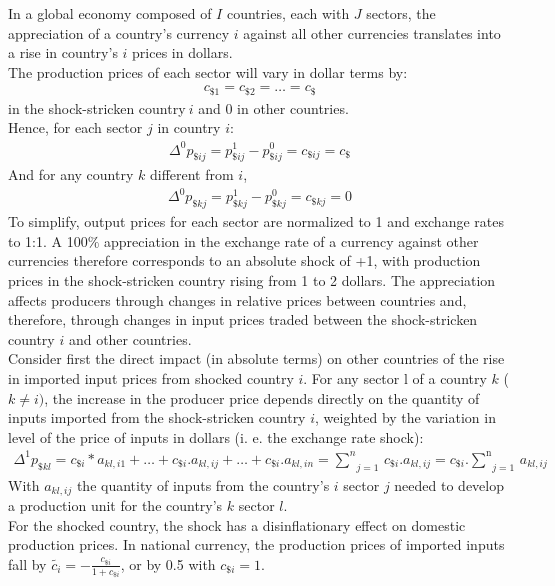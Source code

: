 \documentclass[11pt,a4paper]{article}
\begin{document}
In a global economy composed of $I$ countries, each with $J$ sectors, the appreciation of a country's currency $i$ against all other currencies translates into a rise in country's $i$ prices in dollars. \\ 
The production prices of each sector will vary in dollar terms by:
\begin{eqnarray*}
c_{\$1}=c_{\$2}=\ldots=c_{\$} 
  \end{eqnarray*}	
in the shock-stricken country$~i$ and 0 in other countries. \\
Hence, for each sector $j$ in country  $i$:
\begin{eqnarray*}
 {{\Delta }^{0}}p_{\${ij}}=p_{\${ij}}^{1}-p_{\${ij}}^{0}=c_{\${ij}}=c_{\$}
  \end{eqnarray*}	
And for any country $k$ different from $i$,
\begin{eqnarray*}
 {{\Delta }^{0}}p_{\${kj}}=p_{\${kj}}^{1}-p_{\${kj}}^{0}=c_{\${kj}}=0
 \end{eqnarray*}	
To simplify, output prices for each sector are normalized to 1 and exchange rates to 1:1. A 100$\%$ appreciation in the exchange rate of a currency against other currencies therefore corresponds to an absolute shock of +1, with production prices in the shock-stricken country rising from 1 to 2 dollars. The appreciation affects producers through changes in relative prices between countries and, therefore, through changes in input prices traded between the shock-stricken country $i$ and other countries. \\
Consider first the direct impact (in absolute terms) on other countries of the rise in imported input prices from shocked country $i$. For any sector l of a country $k$ ($k\ne i)$, the increase in the producer price depends directly on the quantity of inputs imported from the shock-stricken country $i$, weighted by the variation in level of the price of inputs in dollars (i. e. the exchange rate shock):\\
\begin{eqnarray}
\Delta ^1 p_{\${kl}}=c_{\${i}}*a_{kl,i1}+\ldots+c_{\${i}}.a_{kl,ij}+\ldots+c_{\$i}.a_{kl,in}=\underset{j=1}{\overset{n}{\mathop\sum}}\,{c}_{\$i}.a_{kl,ij}=c_{\$i}.\underset{j=1}{\overset{\text{n}}{\mathop\sum}}\,a_{kl,ij}  
\label{eq:eq1} 
\end{eqnarray}
With $a_{kl,ij}$ the quantity of inputs from the country's $i$ sector $j$ needed to develop a production unit for the country's $k$ sector $l$. \\
For the shocked country, the shock has a disinflationary effect on domestic production prices. In national currency, the production prices of imported inputs fall by $\widetilde{c_i}=-\frac{c_{\$i}}{1+{c_{\$i}}}$, or by 0.5 with $c_{\$i}=1$. \\
\end{document}
